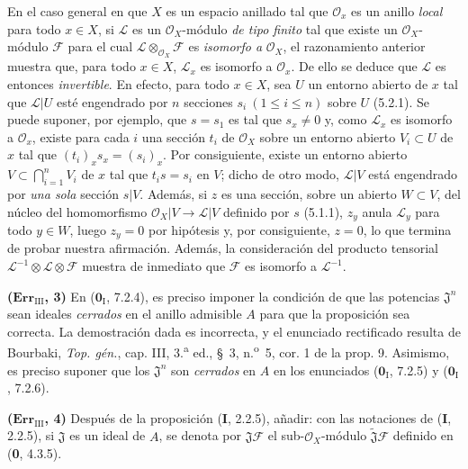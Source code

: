 \documentclass[10pt,oneside]{book}
\newcommand{\oldpage}[2][]{\setcounter{footnote}{0}\marginpar{\scriptsize\textbf{#1}~|~#2}\ignorespaces}
\begin{document}
En el caso general en que $X$ es un espacio anillado tal que $\mathscr O_x$ es
un anillo \emph{local} para
\oldpage[III]{219}
todo $x\in X$, si $\mathscr L$ es un $\mathscr O_X$-módulo \emph{de tipo finito}
tal que existe un $\mathscr O_X$-módulo $\mathscr F$ para el cual
$\mathscr L\otimes_{\mathscr O_X}\mathscr F$ es \emph{isomorfo a}
$\mathscr O_X$, el razonamiento anterior muestra que, para todo $x\in X$,
$\mathscr L_x$ es isomorfo a $\mathscr O_x$. De ello se deduce que $\mathscr L$
es entonces \emph{invertible}. En efecto, para todo $x\in X$, sea $U$ un
entorno abierto de $x$ tal que $\mathscr L|U$ esté engendrado por $n$ secciones
$s_i\ (1\leq i\leq n)$ sobre $U$ (5.2.1). Se puede suponer, por ejemplo, que
$s=s_1$ es tal que $s_x\ne0$ y, como $\mathscr L_x$ es isomorfo a
$\mathscr O_x$, existe para cada $i$ una sección $t_i$ de $\mathscr O_X$ sobre
un entorno abierto $V_i\subset U$ de $x$ tal que
$(t_i)_x s_x=(s_i)_x$. Por consiguiente, existe un entorno abierto
$V\subset\bigcap_{i=1}^nV_i$ de $x$ tal que $t_i s=s_i$ en $V$; dicho de otro
modo, $\mathscr L|V$ está engendrado por \emph{una sola} sección $s|V$. Además,
si $z$ es una sección, sobre un abierto $W\subset V$, del núcleo del
homomorfismo $\mathscr O_X|V\to\mathscr L|V$ definido por $s$ (5.1.1), $z_y$
anula $\mathscr L_y$ para todo $y\in W$, luego $z_y=0$ por hipótesis y, por
consiguiente, $z=0$, lo que termina de probar nuestra afirmación. Además, la
consideración del producto tensorial
$\mathscr L^{-1}\otimes\mathscr L\otimes\mathscr F$ muestra de inmediato que
$\mathscr F$ es isomorfo a $\mathscr L^{-1}$.

\noindent\textbf{($\mathbf{Err}_{\mathrm{III}}$, 3)} En
($\mathbf 0_{\mathrm I}$, 7.2.4), es preciso imponer la condición de que las potencias
$\mathfrak J^n$ sean ideales \emph{cerrados} en el anillo admisible $A$ para
que la proposición sea correcta. La demostración dada es incorrecta, y el
enunciado rectificado resulta de Bourbaki, \emph{Top. gén.}, cap. III,
3.\textsuperscript{a} ed., \S~3, n.\textsuperscript{o}~5, cor. 1 de la prop. 9.
Asimismo, es preciso suponer que los $\mathfrak J^n$ son \emph{cerrados} en $A$
en los enunciados ($\mathbf 0_{\mathrm I}$, 7.2.5) y ($\mathbf 0_{\mathrm I}$, 7.2.6).

\noindent\textbf{($\mathbf{Err}_{\mathrm{III}}$, 4)} Después de la
proposición (\textbf I, 2.2.5), añadir: con las notaciones de (\textbf I, 2.2.5), si
$\mathfrak J$ es un ideal de $A$, se denota por
$\mathfrak J\mathscr F$ el sub-$\mathscr O_X$-módulo
$\widetilde{\mathfrak J}\mathscr F$ definido en (\textbf{0}, 4.3.5).
\end{document}
